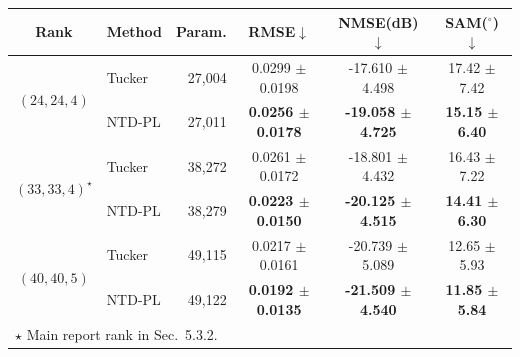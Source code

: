 \begin{tabular}{@{}c l r c c c@{}}
\toprule
Rank & Method & Param. & RMSE$\downarrow$ & NMSE(dB)$\downarrow$ & SAM($^\circ$)$\downarrow$\\
\midrule
\multirow{2}{*}{$(24, 24, 4)$} & Tucker & 27,004 & 0.0299 $\pm$ 0.0198 & -17.610 $\pm$ 4.498 & 17.42 $\pm$ 7.42 \\
 & NTD-PL & 27,011 & \textbf{0.0256 $\pm$ 0.0178} & \textbf{-19.058 $\pm$ 4.725} & \textbf{15.15 $\pm$ 6.40} \\
\midrule
\multirow{2}{*}{$(33, 33, 4)^{\star}$} & Tucker & 38,272 & 0.0261 $\pm$ 0.0172 & -18.801 $\pm$ 4.432 & 16.43 $\pm$ 7.22 \\
 & NTD-PL & 38,279 & \textbf{0.0223 $\pm$ 0.0150} & \textbf{-20.125 $\pm$ 4.515} & \textbf{14.41 $\pm$ 6.30} \\
\midrule
\multirow{2}{*}{$(40, 40, 5)$} & Tucker & 49,115 & 0.0217 $\pm$ 0.0161 & -20.739 $\pm$ 5.089 & 12.65 $\pm$ 5.93 \\
 & NTD-PL & 49,122 & \textbf{0.0192 $\pm$ 0.0135} & \textbf{-21.509 $\pm$ 4.540} & \textbf{11.85 $\pm$ 5.84} \\
\midrule
\multicolumn{6}{l}{\footnotesize $\star$ Main report rank in Sec.~5.3.2.}\\
\bottomrule
\end{tabular}
